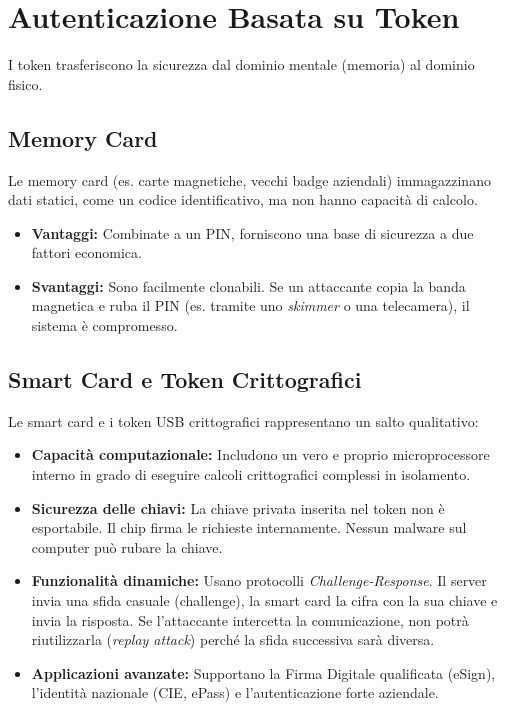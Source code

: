 \section{Autenticazione Basata su Token}

I token trasferiscono la sicurezza dal dominio mentale (memoria) al dominio fisico.

\subsection{Memory Card}
Le memory card (es. carte magnetiche, vecchi badge aziendali) immagazzinano dati statici, come un codice identificativo, ma non hanno capacità di calcolo. 
\begin{itemize}
    \item \textbf{Vantaggi:} Combinate a un PIN, forniscono una base di sicurezza a due fattori economica.
    \item \textbf{Svantaggi:} Sono facilmente clonabili. Se un attaccante copia la banda magnetica e ruba il PIN (es. tramite uno \textit{skimmer} o una telecamera), il sistema è compromesso.
\end{itemize}

\subsection{Smart Card e Token Crittografici}
Le smart card e i token USB crittografici rappresentano un salto qualitativo:
\begin{itemize}
    \item \textbf{Capacità computazionale:} Includono un vero e proprio microprocessore interno in grado di eseguire calcoli crittografici complessi in isolamento.
    \item \textbf{Sicurezza delle chiavi:} La chiave privata inserita nel token non è esportabile. Il chip firma le richieste internamente. Nessun malware sul computer può rubare la chiave.
    \item \textbf{Funzionalità dinamiche:} Usano protocolli \textit{Challenge-Response}. Il server invia una sfida casuale (challenge), la smart card la cifra con la sua chiave e invia la risposta. Se l'attaccante intercetta la comunicazione, non potrà riutilizzarla (\textit{replay attack}) perché la sfida successiva sarà diversa.
    \item \textbf{Applicazioni avanzate:} Supportano la Firma Digitale qualificata (eSign), l'identità nazionale (CIE, ePass) e l'autenticazione forte aziendale.
\end{itemize}

